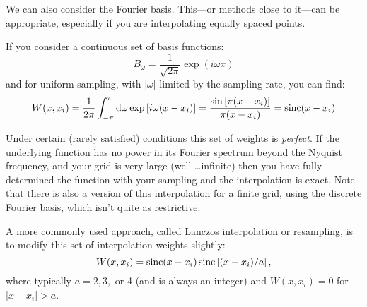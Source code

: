 We can also consider the Fourier basis. This---or methods close to
it---can be appropriate, especially if you are interpolating equally
spaced points. 

If you consider a continuous set of basis functions:
\begin{equation}
B_\omega = \frac{1}{\sqrt{2\pi}} \exp\left( i\omega x\right)
\end{equation}
and for uniform sampling, with $|\omega|$ limited by the sampling
rate, you can find:
\begin{equation}
W(x, x_i) = \frac{1}{2\pi} \int_{-\pi}^{\pi} {\rm
d}\omega \exp\left[i\omega(x - x_i)\right] =
\frac{\sin\left[\pi(x - x_i)\right]}{\pi(x- x_i)} = {\rm sinc}(x-x_i)
\end{equation}

Under certain (rarely satisfied) conditions this set of weights is
{\it perfect}. If the underlying function has no power in its Fourier
spectrum beyond the Nyquist frequency, and your grid is very large
(well \ldots infinite) then you have fully determined the function
with your sampling and the interpolation is exact. Note that there is
also a version of this interpolation for a finite grid, using the
discrete Fourier basis, which isn't quite as restrictive.

A more commonly used approach, called Lanczos interpolation or
resampling, is to modify this set of interpolation weights slightly:
\begin{equation}
W(x, x_i) = {\rm sinc}(x - x_i)\, {\rm sinc}\left[(x-x_i)/a\right],
\end{equation}
where typically $a=2, 3,$ or 4 (and is always an integer) and
$W(x,x_i)=0$ for $|x-x_i|>a$. 


